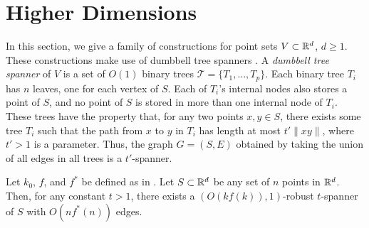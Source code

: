 \documentclass{patmorin}
\begin{document}
\section{Higher Dimensions}

In this section, we give a family of constructions for point sets
$V\subset\mathbb{R}^d$, $d\ge 1$.  These constructions make use of dumbbell
tree spanners \cite{X}.  A \emph{dumbbell tree spanner} of $V$ is a set
of $O(1)$ binary trees $\mathcal{T}=\{T_1,\ldots,T_p\}$.  Each binary
tree $T_i$ has $n$ leaves, one for each vertex of $S$.  Each of $T_i$'s
internal nodes also stores a point of $S$, and no point of $S$ is stored
in more than one internal node of $T_i$.  These trees have the property
that, for any two points $x,y\in S$, there exists some tree $T_i$ such
that the path from $x$ to $y$ in $T_i$ has length at most $t'\|xy\|$,
where $t'>1$ is a parameter.  Thus, the graph $G=(S,E)$ obtained by
taking the union of all edges in all trees is a $t'$-spanner.

\begin{thm}
Let $k_0$, $f$, and $f^*$ be defined as in .
Let $S\subset \mathbb{R}^d$ be any set of $n$ points in $\mathbb{R}^d$.  Then, for any
constant $t>1$,  there exists a $(O(kf(k)),1)$-robust $t$-spanner of $S$
with $O(nf^*(n))$ edges.
\end{thm}
\end{document}
